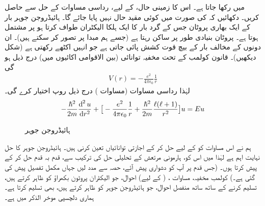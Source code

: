 میں رکھا جاتا ہے۔ اس کا زمینی حال،  کے لیے، رداسی مساوات کے حل سے حاصل کریں۔ دکھائیں کہ 
 کی صورت میں کوئی مقید حال نہیں پایا جائے گا۔
ہائیڈروجن جوہر بار  کے ایک بھاری پروٹان جس کے گرد بار  کا ایک ہلکا الیکٹران طواف کرتا ہو پر مشتمل ہوتا ہے۔ پروٹان بنیادی طور پر ساکن رہتا ہے (جسے ہم مبدا پر تصور کر سکتے ہیں)۔ ان دونوں کے مخالف بار کے بیچ قوت کشش پائی جاتی ہے جو انہیں اکٹھے رکھتی ہے (شکل  دیکھیں)۔ قانون کولمب کے تحت مخفیہ توانائی (بین الاقوامی اکائیوں میں) درج ذیل ہو گی 
 \begin{align}\label{مساوات_ابعادی_کولمب_مخفیہ}
V(r)=-\frac{e^{2}}{4\pi\epsilon_{0}}\frac{1}{r} 
\end{align}
لہٰذا رداسی مساوات (مساوات ) درج ذیل روپ اختیار کرے گی۔
\begin{align}\label{مساوات_ابعادی_رداسی_کولمب}
-\frac{\hslash^{2}}{2m}\frac{\dif^{\,2}{u}}{\dif r^{2}}+\big[-\frac{e^{2}}{4\pi\epsilon_{0}}\frac{1}{r}+\frac{\hslash^{2}}{2m}\frac{\ell(\ell+1)}{r^{2}}\big]u=Eu 
\end{align}


\begin{figure}
\centering
{}
\caption{ہائیڈروجن جوہر}
\label{شکل_تین_ابعادی_ہائیڈروجن_جوہر}
\end{figure}


 ہم نے اس مساوات کو  کے لیے حل کر کے اجازتی توانائیاں  تعین کرنی ہیں۔ ہائیڈروجن جوہر کا حل نہایت اہم ہے لہٰذا میں اس کو، ہارمونی مرتعش کے تحلیلی حل کی ترکیب سے، قدم بہ قدم حل کر کے پیش کرتا ہوں۔ (جس قدم پر آپ کو دشواری پیش آئے، حصہ  سے مدد لیں جہاں مکمل تفصیل پیش کی گئی ہے۔) کولمب مخفیہ، مساوات ، ( کے لیے)  احوال، جو الیکٹران پروٹون بکھراؤ کو ظاہر کرتے ہیں، تسلیم کرنے کے ساتھ ساتھ منفصل  احوال، جو ہائیڈروجن جوہر کو ظاہر کرتے ہیں، بھی تسلیم کرتا ہے۔ ہماری دلچسپی موخر الذکر میں ہے۔

